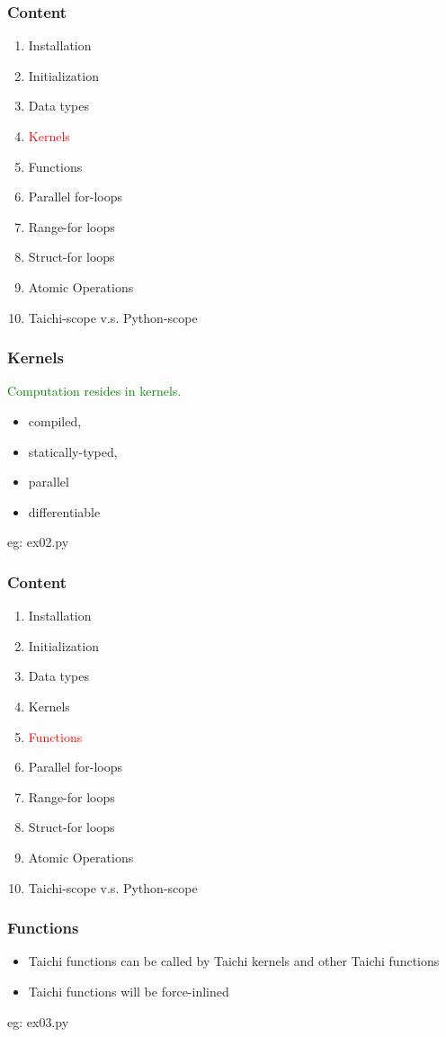 \documentclass[serif,mathserif]{beamer}
\begin{document}
\begin{CJK}{UTF8}{gbsn}
\begin{frame}
  \frametitle{Content}
  \begin{enumerate}
  \item Installation
  \item Initialization
  \item Data types
  \item \textcolor{red}{Kernels}
  \item Functions
  \item Parallel for-loops
  \item Range-for loops
  \item Struct-for loops
  \item Atomic Operations
  \item Taichi-scope v.s. Python-scope
  \end{enumerate}
\end{frame}

\begin{frame}
  \frametitle{Kernels}
  \textcolor{green}{Computation resides in kernels.}
  \begin{itemize}
  \item compiled, 
  \item statically-typed, 
  \item parallel 
  \item differentiable
  \end{itemize}
  eg: ex02.py
  
\end{frame}

\begin{frame}
  \frametitle{Content}
  \begin{enumerate}
  \item Installation
  \item Initialization
  \item Data types
  \item Kernels
  \item \textcolor{red}{Functions}
  \item Parallel for-loops
  \item Range-for loops
  \item Struct-for loops
  \item Atomic Operations
  \item Taichi-scope v.s. Python-scope
  \end{enumerate}
\end{frame}

\begin{frame}
  \frametitle{Functions}
  \begin{itemize}
  \item Taichi functions can be called by Taichi kernels and other Taichi functions
  \item Taichi functions will be force-inlined
  \end{itemize}

  eg: ex03.py

  
\end{frame}

\end{CJK}
\end{document}
